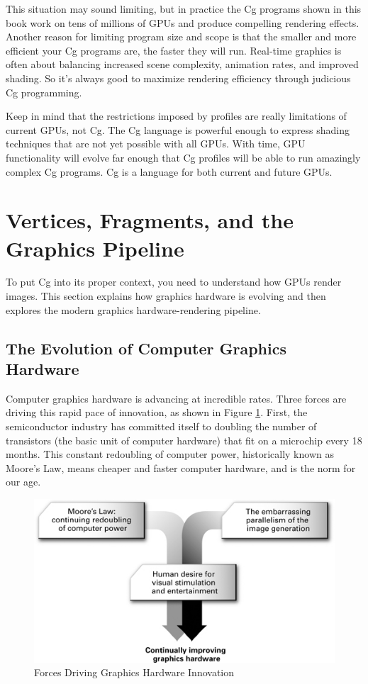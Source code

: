 \documentclass{book}
\begin{document}
This situation may sound limiting, but in practice the Cg programs shown in this book work on tens of millions of GPUs and produce compelling rendering effects. Another reason for limiting program size and scope is that the smaller and more efficient your Cg programs are, the faster they will run. Real-time graphics is often about balancing increased scene complexity, animation rates, and improved shading. So it's always good to maximize rendering efficiency through judicious Cg programming.

Keep in mind that the restrictions imposed by profiles are really limitations of current GPUs, not Cg. The Cg language is powerful enough to express shading techniques that are not yet possible with all GPUs. With time, GPU functionality will evolve far enough that Cg profiles will be able to run amazingly complex Cg programs. Cg is a language for both current and future GPUs.

\section{Vertices, Fragments, and the Graphics Pipeline}

To put Cg into its proper context, you need to understand how GPUs render images. This section explains how graphics hardware is evolving and then explores the modern graphics hardware-rendering pipeline.

\subsection{The Evolution of Computer Graphics Hardware}

Computer graphics hardware is advancing at incredible rates. Three forces are driving this rapid pace of innovation, as shown in Figure \ref{fig:1-2}. First, the semiconductor industry has committed itself to doubling the number of transistors (the basic unit of computer hardware) that fit on a microchip every 18 months. This constant redoubling of computer power, historically known as Moore's Law, means cheaper and faster computer hardware, and is the norm for our age.

\begin{figure}
    \centering
    \includegraphics[width=1\linewidth]{Images/fig1_2.jpg}
    \caption{Forces Driving Graphics Hardware Innovation}
    \label{fig:1-2}
\end{figure}
\end{document}
